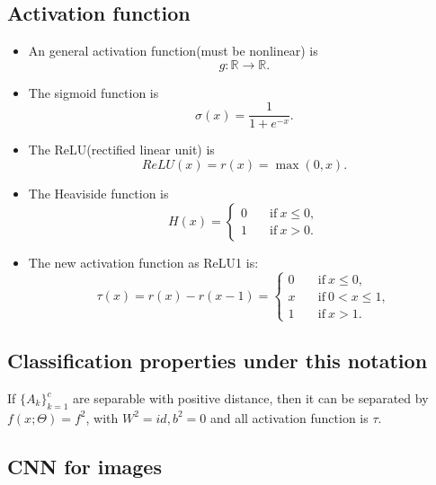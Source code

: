 \subsection{Activation function}
        \begin{itemize}
	\item An general activation function(must be nonlinear) is
	$$g: \mathbb{R} \to  \mathbb{R}.$$
        \item The sigmoid function is
        $$\sigma(x) = \frac{1}{1 + e^{-x}}.$$
	\item The ReLU(rectified linear unit) is
	$$
	ReLU(x) = r(x) = \max(0, x).
	$$
	\item The Heaviside function is
	$$
	H(x ) = \begin{cases}
	0 \quad &\text{if} ~ x \le 0, \\
	1 \quad &\text{if} ~ x > 0.
	\end{cases}
	$$
	\item The new activation function as ReLU1 is:
	$$
	\tau(x) = r(x) - r(x-1) = \begin{cases}
	0 \quad &\text{if} ~ x \le 0, \\
	x \quad &\text{if} ~  0 < x \le 1, \\
	1  \quad &\text{if} ~ x > 1.
	\end{cases}
	$$

	\end{itemize}

\subsection{Classification properties under this notation}
\begin{theorem}
  If $\{A_k\}_{k=1}^c$ are separable with positive distance, then it
  can be separated by $f(x; \Theta) = f^2$, with $W^2= id, b^2=0$ and
  all activation function is $\tau$.
\end{theorem}

\subsection{CNN for images}
